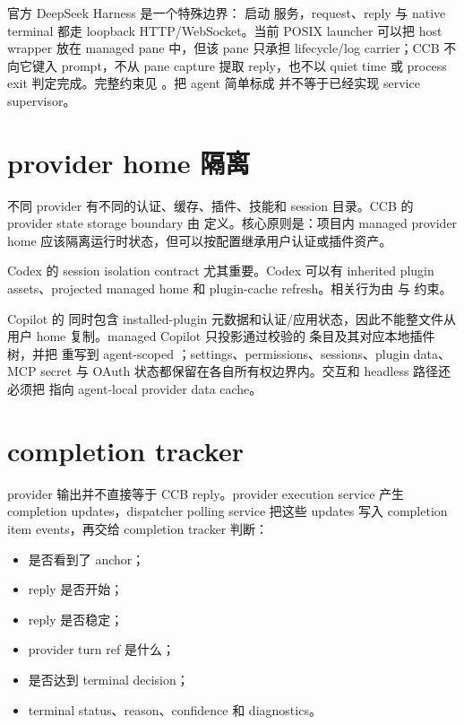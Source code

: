 官方 DeepSeek Harness 是一个特殊边界： 启动  服务，request、reply 与 native terminal 都走 loopback HTTP/WebSocket。当前 POSIX launcher 可以把 host wrapper 放在 managed pane 中，但该 pane 只承担 lifecycle/log carrier；CCB 不向它键入 prompt，不从 pane capture 提取 reply，也不以 quiet time 或 process exit 判定完成。完整约束见 。把 agent 简单标成  并不等于已经实现 service supervisor。

\section{provider home 隔离}

不同 provider 有不同的认证、缓存、插件、技能和 session 目录。CCB 的 provider state storage boundary 由  定义。核心原则是：项目内 managed provider home 应该隔离运行时状态，但可以按配置继承用户认证或插件资产。

Codex 的 session isolation contract 尤其重要。Codex 可以有 inherited plugin assets、projected managed home 和 plugin-cache refresh。相关行为由  与  约束。

Copilot 的  同时包含 installed-plugin 元数据和认证/应用状态，因此不能整文件从用户 home 复制。managed Copilot 只投影通过校验的  条目及其对应本地插件树，并把  重写到 agent-scoped ；settings、permissions、sessions、plugin data、MCP secret 与 OAuth 状态都保留在各自所有权边界内。交互和 headless 路径还必须把  指向 agent-local provider data cache。

\section{completion tracker}

provider 输出并不直接等于 CCB reply。provider execution service 产生 completion updates，dispatcher polling service 把这些 updates 写入 completion item events，再交给 completion tracker 判断：

\begin{itemize}
  \item 是否看到了 anchor；
  \item reply 是否开始；
  \item reply 是否稳定；
  \item provider turn ref 是什么；
  \item 是否达到 terminal decision；
  \item terminal status、reason、confidence 和 diagnostics。
\end{itemize}

